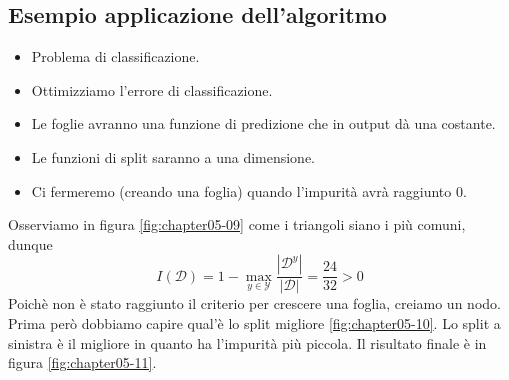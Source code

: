 \subsection{Esempio applicazione dell'algoritmo}
\begin{multicols}{2}
	\begin{itemize}
		\item Problema di classificazione.
		\item Ottimizziamo l'errore di classificazione.
		\item Le foglie avranno una funzione di predizione che in output d\`a una costante.
		\item Le funzioni di split saranno a una dimensione.
		\item Ci fermeremo (creando una foglia) quando l'impurit\`a avr\`a raggiunto $0$.
	\end{itemize}
\end{multicols}
Osserviamo in figura \ref{fig:chapter05-09} come i triangoli siano i pi\`u comuni, dunque  $$I(\mathcal{D})= 1 -\max\limits_{y\in\mathcal{Y}}\dfrac{|\mathcal{D}^y|}{|\mathcal{D}|} = \frac{24}{32} > 0$$
Poich\`e non \`e stato raggiunto il criterio per crescere una foglia, creiamo un nodo. Prima per\`o dobbiamo capire qual'\`e lo split migliore \ref{fig:chapter05-10}. Lo split a sinistra \`e il migliore in quanto ha l'impurit\`a pi\`u piccola. Il risultato finale \`e in figura \ref{fig:chapter05-11}.
